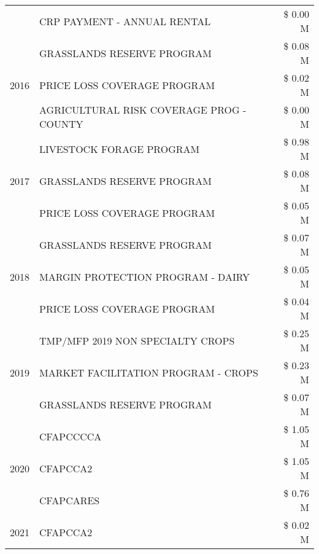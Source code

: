 \begin{tabular}{llr}
 & CRP PAYMENT - ANNUAL RENTAL & \$ 0.00 M \\
\cline{1-3}
\multirow[t]{3}{*}{2016} & GRASSLANDS RESERVE PROGRAM & \$ 0.08 M \\
 & PRICE LOSS COVERAGE PROGRAM & \$ 0.02 M \\
 & AGRICULTURAL RISK COVERAGE PROG - COUNTY & \$ 0.00 M \\
\cline{1-3}
\multirow[t]{3}{*}{2017} & LIVESTOCK FORAGE PROGRAM & \$ 0.98 M \\
 & GRASSLANDS RESERVE PROGRAM & \$ 0.08 M \\
 & PRICE LOSS COVERAGE PROGRAM & \$ 0.05 M \\
\cline{1-3}
\multirow[t]{3}{*}{2018} & GRASSLANDS RESERVE PROGRAM & \$ 0.07 M \\
 & MARGIN PROTECTION PROGRAM - DAIRY & \$ 0.05 M \\
 & PRICE LOSS COVERAGE PROGRAM & \$ 0.04 M \\
\cline{1-3}
\multirow[t]{3}{*}{2019} & TMP/MFP 2019 NON SPECIALTY CROPS & \$ 0.25 M \\
 & MARKET FACILITATION PROGRAM - CROPS & \$ 0.23 M \\
 & GRASSLANDS RESERVE PROGRAM & \$ 0.07 M \\
\cline{1-3}
\multirow[t]{3}{*}{2020} & CFAPCCCCA & \$ 1.05 M \\
 & CFAPCCA2 & \$ 1.05 M \\
 & CFAPCARES & \$ 0.76 M \\
\cline{1-3}
2021 & CFAPCCA2 & \$ 0.02 M \\
\cline{1-3}
\bottomrule
\end{tabular}
